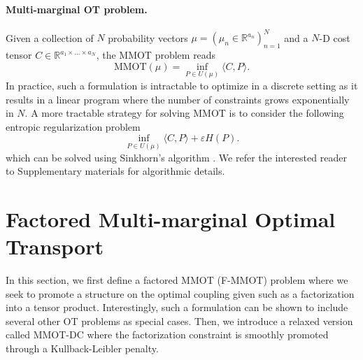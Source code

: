 \documentclass{article}
\begin{document}
\paragraph{Multi-marginal OT problem.} Given a collection of $N$ probability vectors $\mu = (\mu_n \in \mathbb R^{a_n})_{n=1}^N$ 
and a $N$-D cost tensor $C \in \mathbb R^{a_1 \times ... \times a_N}$, the MMOT problem reads
\begin{equation*}
  \text{MMOT}(\mu) = \inf_{P \in U(\mu)} \langle C, P \rangle.
\end{equation*}
In practice, such a formulation is intractable to optimize in a discrete setting as it results in a linear program where the number 
of constraints grows exponentially in $N$. A more tractable strategy for solving MMOT is to consider the following entropic 
regularization problem
\begin{equation} \label{MMOT_primal}
  \inf_{P \in U(\mu)} \langle C, P \rangle + \varepsilon H(P).
\end{equation}
which can be solved using Sinkhorn's algorithm \cite{Benamou14}. We refer the interested reader to Supplementary materials for algorithmic details.


\section{Factored Multi-marginal Optimal Transport}
In this section, we first define a factored MMOT (F-MMOT) problem where we seek to promote a structure on the optimal coupling 
given such as a factorization into a tensor product. Interestingly, such a formulation can be shown to include several other 
OT problems as special cases. Then, we introduce a relaxed version called MMOT-DC where the factorization constraint is 
smoothly promoted through a Kullback-Leibler penalty.
\end{document}
